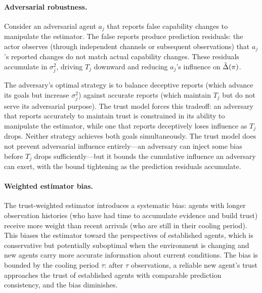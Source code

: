 \paragraph{Adversarial robustness.} Consider an adversarial agent $a_j$ that reports false capability changes to manipulate the estimator. The false reports produce prediction residuals: the actor observes (through independent channels or subsequent observations) that $a_j$'s reported changes do not match actual capability changes. These residuals accumulate in $\sigma_j^2$, driving $T_j$ downward and reducing $a_j$'s influence on $\hat{\Delta}(\pi)$.

The adversary's optimal strategy is to balance deceptive reports (which advance its goals but increase $\sigma_j^2$) against accurate reports (which maintain $T_j$ but do not serve its adversarial purpose). The trust model forces this tradeoff: an adversary that reports accurately to maintain trust is constrained in its ability to manipulate the estimator, while one that reports deceptively loses influence as $T_j$ drops. Neither strategy achieves both goals simultaneously. The trust model does not prevent adversarial influence entirely---an adversary can inject some bias before $T_j$ drops sufficiently---but it bounds the cumulative influence an adversary can exert, with the bound tightening as the prediction residuals accumulate.

\paragraph{Weighted estimator bias.} The trust-weighted estimator introduces a systematic bias: agents with longer observation histories (who have had time to accumulate evidence and build trust) receive more weight than recent arrivals (who are still in their cooling period). This biases the estimator toward the perspectives of established agents, which is conservative but potentially suboptimal when the environment is changing and new agents carry more accurate information about current conditions. The bias is bounded by the cooling period $\tau$: after $\tau$ observations, a reliable new agent's trust approaches the trust of established agents with comparable prediction consistency, and the bias diminishes.

